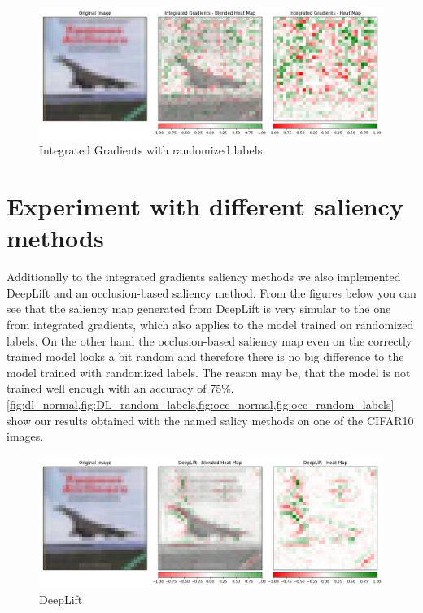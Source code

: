 \documentclass{article}
\begin{document}
\begin{figure}[h!]
\centering
\includegraphics[width=\textwidth]{results/IG_random_labels.png}
\caption{Integrated Gradients with randomized labels}
\label{fig:ig_random_labels}
\end{figure}

\clearpage



\section{Experiment with different saliency methods}
Additionally to the integrated gradients saliency methods we also implemented DeepLift and an occlusion-based saliency method. From the figures below you can see that the saliency map generated from DeepLift is very simular to the one from integrated gradients, which also applies to the model trained on randomized labels. On the other hand the occlusion-based saliency map even on the correctly trained model looks a bit random and therefore there is no big difference to the model trained with randomized labels. The reason may be, that the model is not trained well enough with an accuracy of 75\%.\\

\cref{fig:dl_normal,fig:DL_random_labels,fig:occ_normal,fig:occ_random_labels} show our results obtained with the named salicy methods on one of the CIFAR10 images.

\begin{figure}[h!]
\centering
\includegraphics[width=\textwidth]{results/DL_normal.png}
\caption{DeepLift}
\label{fig:dl_normal}
\end{figure}
\end{document}
